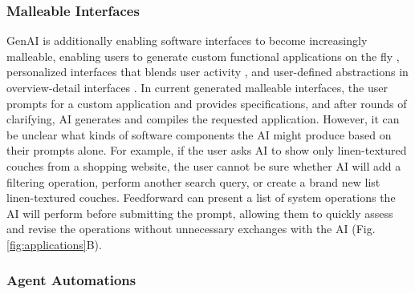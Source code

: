 


\subsubsection{Malleable Interfaces}

GenAI is additionally enabling software interfaces to become increasingly malleable, enabling users to generate custom functional applications on the fly \cite{litt2025workout, onetwoval2025calculator}, personalized interfaces that blends user activity \cite{cao2025jelly}, and user-defined abstractions in overview-detail interfaces \cite{malleableODI}.
In current generated malleable interfaces, the user prompts for a custom application and provides specifications, and after rounds of clarifying, AI generates and compiles the requested application. However, it can be unclear what kinds of software components the AI might produce based on their prompts alone. For example, if the user asks AI to show only linen-textured couches from a shopping website, the user cannot be sure whether AI will add a filtering operation, perform another search query, or create a brand new list linen-textured couches. Feedforward can present a list of system operations the AI will perform before submitting the prompt, allowing them to quickly assess and revise the operations without unnecessary exchanges with the AI (Fig. \ref{fig:applications}B).





\subsubsection{Agent Automations}

